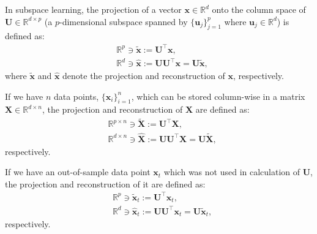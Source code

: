 \documentclass[lang=cn,10pt]{gorgeousnbook}
\numberwithin{equation}{section}%
\numberwithin{figure}{section}%
\begin{document}
In subspace learning, the projection of a vector $\boldsymbol{x} \in \mathbb{R}^d$ onto the column space of $\boldsymbol{U} \in \mathbb{R}^{d \times p}$ (a $p$-dimensional subspace spanned by $\{\boldsymbol{u}_j\}_{j=1}^p$ where $\boldsymbol{u}_j \in \mathbb{R}^d$) is defined as:
\begin{align}
&\mathbb{R}^{p} \ni \widetilde{\boldsymbol{x}} := \boldsymbol{U}^\top \boldsymbol{x}, \label{equation_projection_training_onePoint_severalDirections} \\
&\mathbb{R}^{d} \ni \widehat{\boldsymbol{x}} := \boldsymbol{U}\boldsymbol{U}^\top \boldsymbol{x} = \boldsymbol{U} \widetilde{\boldsymbol{x}}, \label{equation_reconstruction_training_onePoint_severalDirections}
\end{align}
where $\widetilde{\boldsymbol{x}}$ and $\widehat{\boldsymbol{x}}$ denote the projection and reconstruction of $\boldsymbol{x}$, respectively.

If we have $n$ data points, $\{\boldsymbol{x}_i\}_{i=1}^n$, which can be stored column-wise in a matrix $\boldsymbol{X} \in \mathbb{R}^{d \times n}$, the projection and reconstruction of $\boldsymbol{X}$ are defined as:
\begin{align}
&\mathbb{R}^{p \times n} \ni \widetilde{\boldsymbol{X}} := \boldsymbol{U}^\top \boldsymbol{X}, \label{equation_projection_training_SeveralPoints_severalDirections} \\
&\mathbb{R}^{d \times n} \ni \widehat{\boldsymbol{X}} := \boldsymbol{U}\boldsymbol{U}^\top \boldsymbol{X} = \boldsymbol{U} \widetilde{\boldsymbol{X}}, \label{equation_reconstruction_training_SeveralPoints_severalDirections}
\end{align}
respectively.

If we have an out-of-sample data point $\boldsymbol{x}_t$ which was not used in calculation of $\boldsymbol{U}$, the projection and reconstruction of it are defined as:
\begin{align}
&\mathbb{R}^{p} \ni \widetilde{\boldsymbol{x}}_t := \boldsymbol{U}^\top \boldsymbol{x}_t, \label{equation_projection_outOfSample_onePoint_severalDirections} \\
&\mathbb{R}^{d} \ni \widehat{\boldsymbol{x}}_t := \boldsymbol{U}\boldsymbol{U}^\top \boldsymbol{x}_t = \boldsymbol{U} \widetilde{\boldsymbol{x}}_t, \label{equation_reconstruction_outOfSample_onePoint_severalDirections}
\end{align}
respectively.
\end{document}
